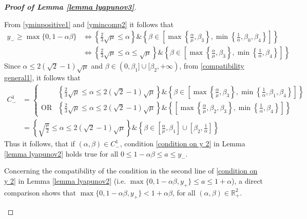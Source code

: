\documentclass[reqno]{amsart}
\theoremstyle{plain}
\theoremstyle{definition}
\theoremstyle{remark}
\newcommand{\R}{\mathbb{R}}	%
\newcommand{\VM}[1]{}
\begin{document}
\begin{proof}[\textbf{Proof of Lemma \ref{lemma lyapunov3}}]
\begin{itemize}[wide=0pt]
\begin{itemize}[wide=5pt]
			From \eqref{yminpositive1} and \eqref{ymincomp2} it follows that
			\begin{equation}\label{compatibility general1}
				\begin{aligned}
					y_{-}\geq \max\{0,1-\alpha\beta\} & \Leftrightarrow \left\{ \frac{2}{3}\sqrt{\mu}\leq \alpha\right\}\&\left\{\beta\in\left[\max\left\{\frac{\alpha}{\mu},\beta_{3}\right\},\min\left\{\frac{1}{\alpha},\beta_{0},\beta_{4}\right\}\right]\right\} \\
					& \Leftrightarrow \left\{\frac{2}{3}\sqrt{\mu}\leq \alpha\leq \sqrt{\mu}\right\}\&\left\{\beta\in\left[\max\left\{\frac{\alpha}{\mu},\beta_{3}\right\},\min\left\{\frac{1}{\alpha},\beta_{4}\right\}\right]\right\}
				\end{aligned}
			\end{equation}
			Since $\alpha\leq 2(\sqrt{2}-1)\sqrt{\mu}$ and $\beta\in (0,\beta_{1}]\cup[\beta_{2},+\infty)$, from \eqref{compatibility general1}, it follows that
			\begin{equation}\label{compatibility case1}
				\begin{aligned}
					C_{-}^{1} &= \begin{cases}
						& \left\{\frac{2}{3}\sqrt{\mu}\leq \alpha\leq 2(\sqrt{2}-1)\sqrt{\mu}\right\}\&\left\{\beta\in \left[\max\left\{\frac{\alpha}{\mu},\beta_{3}\right\},\min\left\{\frac{1}{\alpha},\beta_{1},\beta_{4}\right\}\right]\right\}\\
						\text{OR} & \left\{\frac{2}{3}\sqrt{\mu}\leq \alpha \leq 2(\sqrt{2}-1)\sqrt{\mu}\right\} \&\left\{\left[\max\left\{\frac{\alpha}{\mu},\beta_{2},\beta_{3}\right\},\min\left\{\frac{1}{\alpha},\beta_{4}\right\}\right]\right\}			
					\end{cases} \\ 
					&=\left\{\sqrt{\frac{\mu}{2}} \leq \alpha \leq 2(\sqrt{2}-1)\sqrt{\mu}\right\} \& \left\{\beta\in \left[ \frac{\alpha}{\mu},\beta_{1}\right]\cup\left[\beta_{2},\frac{1}{\alpha}\right]\right\}		
				\end{aligned}
			\end{equation}
			Thus it follows, that if $(\alpha,\beta) \in C_{-}^{1}$, condition \eqref{condition on y 2} in Lemma \ref{lemma lyapunov2} holds true for all $0\leq 1-\alpha\beta \leq a \leq y_{-}$.
			
			Concerning the compatibility of the condition in the second line of \eqref{condition on y 2} in Lemma \ref{lemma lyapunov2} (i.e. $\max\{0,1-\alpha\beta,y_{+}\} \leq a \leq 1+\alpha$), a direct comparison shows that $\max\{0,1-\alpha\beta,y_{+}\}<1+\alpha\beta$, for all $(\alpha,\beta)\in \R^{2}_{+}$. 
			

\end{itemize}
\end{itemize}
\end{proof}
\end{document}
